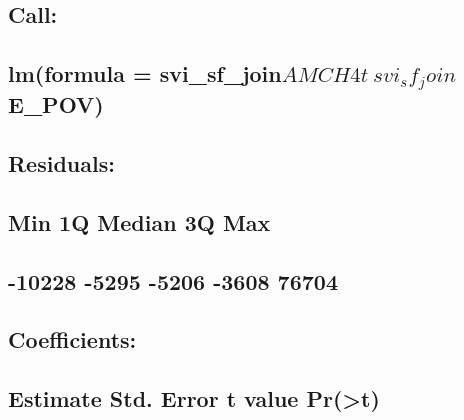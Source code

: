 \documentclass[
  12pt,
]{article}
\begin{document}
\hypertarget{call-9}{%
\subsection{Call:}\label{call-9}}

\hypertarget{lmformula-svi_sf_joinamch4t-svi_sf_joine_pov}{%
\subsection{\texorpdfstring{lm(formula =
svi\_sf\_join\(AMCH4t ~ svi_sf_join\)E\_POV)}{lm(formula = svi\_sf\_joinAMCH4t \textasciitilde{} svi\_sf\_joinE\_POV)}}\label{lmformula-svi_sf_joinamch4t-svi_sf_joine_pov}}

\hypertarget{section-95}{%
\subsection{}\label{section-95}}

\hypertarget{residuals-9}{%
\subsection{Residuals:}\label{residuals-9}}

\hypertarget{min-1q-median-3q-max-9}{%
\subsection{Min 1Q Median 3Q Max}\label{min-1q-median-3q-max-9}}

\hypertarget{section-96}{%
\subsection{-10228 -5295 -5206 -3608 76704}\label{section-96}}

\hypertarget{section-97}{%
\subsection{}\label{section-97}}

\hypertarget{coefficients-9}{%
\subsection{Coefficients:}\label{coefficients-9}}

\hypertarget{estimate-std.-error-t-value-prt-9}{%
\subsection{Estimate Std. Error t value
Pr(\textgreater\textbar t\textbar)}\label{estimate-std.-error-t-value-prt-9}}
\end{document}

